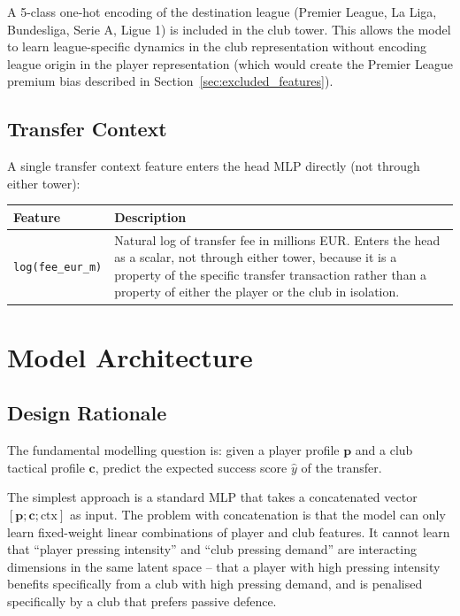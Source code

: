 \documentclass[12pt, a4paper, oneside]{report}
\begin{document}
A 5-class one-hot encoding of the destination league (Premier League, La Liga, Bundesliga, Serie A, Ligue 1) is included in the club tower. This allows the model to learn league-specific dynamics in the club representation without encoding league origin in the player representation (which would create the Premier League premium bias described in Section~\ref{sec:excluded_features}).

\section{Transfer Context}

A single transfer context feature enters the head MLP directly (not through either tower):

\begin{table}[H]
\centering
\begin{tabular}{p{3cm} p{10cm}}
\toprule
\textbf{Feature} & \textbf{Description} \\
\midrule
\texttt{log(fee\_eur\_m)} & Natural log of transfer fee in millions EUR. Enters the head as a scalar, not through either tower, because it is a property of the specific transfer transaction rather than a property of either the player or the club in isolation. \\
\bottomrule
\end{tabular}
\end{table}

\chapter{Model Architecture}
\label{chap:model}

\section{Design Rationale}

The fundamental modelling question is: given a player profile $\mathbf{p}$ and a club tactical profile $\mathbf{c}$, predict the expected success score $\hat{y}$ of the transfer.

The simplest approach is a standard MLP that takes a concatenated vector $[\mathbf{p}; \mathbf{c}; \text{ctx}]$ as input. The problem with concatenation is that the model can only learn fixed-weight linear combinations of player and club features. It cannot learn that ``player pressing intensity'' and ``club pressing demand'' are interacting dimensions in the same latent space -- that a player with high pressing intensity benefits specifically from a club with high pressing demand, and is penalised specifically by a club that prefers passive defence.
\end{document}
